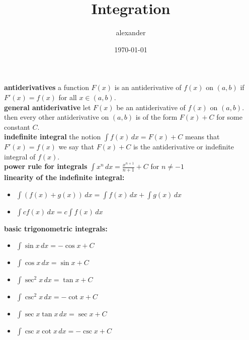 \documentclass{article}
\title{Integration}
\author{alexander}
\date{\today}
\begin{document}
\maketitle

\textbf{antiderivatives} a function $F(x)$ is an antiderivative of $f(x)$ on $(a, b)$ if $F'(x) = f(x)$ for all $x \in (a, b)$.\\
\textbf{general antiderivative} let $F(x)$ be an antiderivative of $f(x)$ on $(a, b)$. then every other antiderivative on $(a, b)$ is of the form $F(x) + C$ for some constant $C$.\\
\textbf{indefinite integral} the notion $\int f(x)\,dx = F(x) + C$ means that $F'(x) = f(x)$ we say that $F(x) + C$ is the antiderivative or indefinite integral of $f(x)$.\\
\textbf{power rule for integrals} $\int x^n\,dx = \frac{x^{n + 1}}{n + 1} + C$ for $n \neq -1$\\ 
\textbf{linearity of the indefinite integral:}
	\begin{itemize}
		\item $\int (f(x) + g(x))\,dx = \int f(x)\,dx + \int g(x)\,dx$
		\item $\int cf(x)\,dx = c\int f(x)\,dx$
	\end{itemize}

\textbf{basic trigonometric integrals:}
	\begin{itemize}		
		\item $\int \sin x \,dx = -\cos x + C$
		\item $\int \cos x \,dx = \sin x + C$
		\item $\int \sec^2 x \,dx = \tan x + C$
		\item $\int \csc^2 x \,dx = -\cot x + C$
		\item $\int \sec x \tan x \,dx = \sec x + C$
		\item $\int \csc x \cot x \,dx = -\csc x + C$
	\end{itemize}
\end{document}
